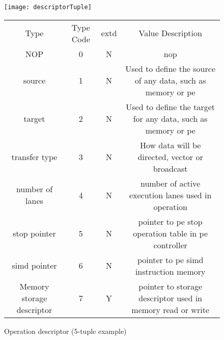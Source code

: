 \begin{figure}[!t]
  \centering
  \captionsetup{justification=centering}

  \begin{minipage}{1\textwidth}
    \centering
    \begin{minipage}{0.85\textwidth}
      \centering
      \captionsetup{justification=centering}
      \captionsetup{width=.9\linewidth}
      \centerline{
      \mbox{\texttt{[image: descriptorTuple]}}
      }
      \vspace{-2mm}
      \caption{Operation descriptor (5-tuple example)}
      \label{fig:descriptorTuple}
    \end{minipage}
    \begin{minipage}{0.85\textwidth}
        \vspace{5mm}
        \begin{adjustbox}{width=1\textwidth}
            \footnotesize
            \begin{tabular}{ |c|c|c|c|  }
              \hline
              \rowcolor{gray!50}
              \multicolumn{4}{|c|}{Source} \\
              \hline
              \rowcolor{gray!25}
              Type & Type Code & extd &  Value Description  \\
              \hline
              NOP                              &    0   &  N&  \acl{nop} \\
              source                           &    1   &  N&  Used to define the source of any data, such as memory or \ac{pe}  \\
              target                           &    2   &  N&  Used to define the target for any data, such as memory or \ac{pe}  \\
              transfer type                    &    3   &  N&  How data will be directed, vector or broadcast                    \\
              number of lanes                  &    4   &  N&  number of active execution lanes used in operation \\
              \ac{stop} pointer                &    5   &  N&  pointer to \ac{pe} \ac{stop} operation table in \ac{pe} controller \\
              \ac{simd} pointer                &    6   &  N&  pointer to \ac{pe} \ac{simd} instruction memory  \\
              Memory storage descriptor        &    7   &  Y&  pointer to storage descriptor used in memory read or write \\

\end{tabular}
\end{adjustbox}
\end{minipage}
\end{minipage}
\end{figure}
